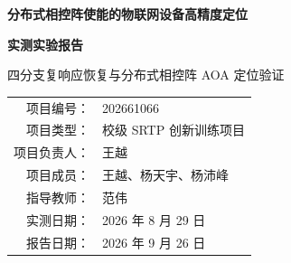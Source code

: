 \documentclass[UTF8,12pt,a4paper]{ctexart}
\begin{document}
\begin{titlepage}
  \centering
  \vspace*{18mm}
  {\bfseries 分布式相控阵使能的物联网设备高精度定位\par}
  \vspace{10mm}
  {\bfseries 实测实验报告\par}
  \vspace{8mm}
  {\Large 四分支复响应恢复与分布式相控阵 AOA 定位验证\par}
  \vfill
  \begin{tabular}{rl}
    项目编号： & 202661066 \\
    项目类型： & 校级 SRTP 创新训练项目 \\
    项目负责人： & 王越 \\
    项目成员： & 王越、杨天宇、杨沛峰 \\
    指导教师： & 范伟 \\
    实测日期： & 2026 年 8 月 29 日 \\
    报告日期： & 2026 年 9 月 26 日 \\
  \end{tabular}
  \vfill
\end{titlepage}

\begin{abstract}
本实验使用 Anritsu MS46322B 矢量网络分析仪和 32 通道、$8\times4$ 阵元相控阵，在同一信源位置下完成四个阵列位置的 On/Off、Hadamard 和 REV 测量，以验证分布式相控阵 AOA 定位链路。三种采集方式形成四条分析分支：Branch 1 复数 DFT、Branch 2 On/Off、Branch 3 Hadamard 和 Branch 4 严格功率 REV。Branch 4 在形成 $|Z_{\mathrm{REV}}|^2$ 后完全不再使用 VNA 相位，仅由功率随受控相移的变化恢复阵元相对复响应；各阵位完成宽带方向估计后，联合实现多阵位 AOA 定位。

标准 51 频点复响应分析中，Branch 1 与 Branch 4 的阵元复响应相干系数为 0.943，对齐相位均方根误差为 $15.30^\circ$；Bartlett 四阵位定位的四条分支误差分别为 1.160 m、1.172 m、1.162 m 和 1.122 m，估计位置高度集中。统一的 21 频点全组合分析覆盖 Branch 4 的全部 3--9 次相移观测子集，共 469 种复响应方法；每种方法分别接入 Bartlett 和 MUSIC，并执行 11 种多阵位定位组合。相移观测数增加时，功率 REV 的有效率和复响应一致性稳定改善。

在这一 21 频点的平行处理框架中，Bartlett/常规波束形成与单快拍形式 MUSIC 各得到 1876 条单阵位 DOA 和 5159 条定位链。四阵位定位的全部 10 个方法分组中，MUSIC 的误差中位数均低于 Bartlett，同子集配对差值中位数改善 0.031--0.058 m，显示出这批实测数据上的一致小幅收益。两种方法使用完全相同的复响应和定位几何，使这一差别可直接归于测向谱的处理方式。

总体而言，严格功率 REV 与三个复数参考分支在复响应、方向估计和 AOA 定位结果上相互印证，表明从功率观测恢复阵元相对复响应并完成分布式相控阵 AOA 定位的算法链条已经在实物系统中跑通。MUSIC 与 Bartlett 的独立处理又给出方向一致的定位结果，且 MUSIC 在本批四阵位配对中呈稳定的小幅改进。四分支共同的约 1.1 m 绝对偏差主要体现了当前仪器、几何记录及室内传播环境叠加后的端到端系统误差；它没有掩盖 REV 响应恢复与 AOA 定位链条的一致性。

\textbf{关键词：}功率 REV；分布式相控阵；AOA 定位；MUSIC；Beamforming；实测验证
\end{abstract}
\end{document}
